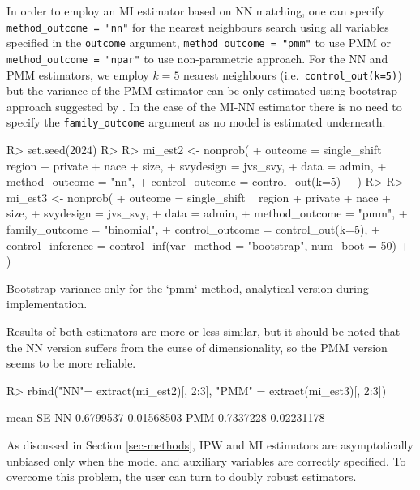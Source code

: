 \documentclass[
]{jss}
\begin{document}
In order to employ an MI estimator based on NN matching, one can specify
\texttt{method\_outcome\ =\ "nn"} for the nearest neighbours search
using all variables specified in the \texttt{outcome} argument,
\texttt{method\_outcome\ =\ "pmm"} to use PMM or
\texttt{method\_outcome\ =\ "npar"} to use non-parametric approach. For
the NN and PMM estimators, we employ \(k=5\) nearest neighbours
(i.e.~\texttt{control\_out(k=5)}) but the variance of the PMM estimator
can be only estimated using bootstrap approach suggested by
\citet{chlebicki2025}. In the case of the MI-NN estimator there is no
need to specify the \texttt{family\_outcome} argument as no model is
estimated underneath.

\begin{CodeChunk}
\begin{CodeInput}
R> set.seed(2024)
R> 
R> mi_est2 <- nonprob(
+   outcome = single_shift ~ region + private + nace + size,
+   svydesign = jvs_svy,
+   data = admin,
+   method_outcome = "nn",
+   control_outcome = control_out(k=5)
+ )
R> 
R> mi_est3 <- nonprob(
+   outcome = single_shift ~ region + private + nace + size,
+   svydesign = jvs_svy,
+   data = admin,
+   method_outcome = "pmm",
+   family_outcome = "binomial", 
+   control_outcome = control_out(k=5),
+   control_inference = control_inf(var_method = "bootstrap", num_boot = 50)
+ )
\end{CodeInput}
\begin{CodeOutput}
Bootstrap variance only for the `pmm` method, analytical version during implementation.
\end{CodeOutput}
\end{CodeChunk}

Results of both estimators are more or less similar, but it should be
noted that the NN version suffers from the curse of dimensionality, so
the PMM version seems to be more reliable.

\begin{CodeChunk}
\begin{CodeInput}
R> rbind("NN"= extract(mi_est2)[, 2:3], "PMM" = extract(mi_est3)[, 2:3])
\end{CodeInput}
\begin{CodeOutput}
         mean         SE
NN  0.6799537 0.01568503
PMM 0.7337228 0.02231178
\end{CodeOutput}
\end{CodeChunk}

As discussed in Section \ref{sec-methods}, IPW and MI estimators are
asymptotically unbiased only when the model and auxiliary variables are
correctly specified. To overcome this problem, the user can turn to
doubly robust estimators.
\end{document}

